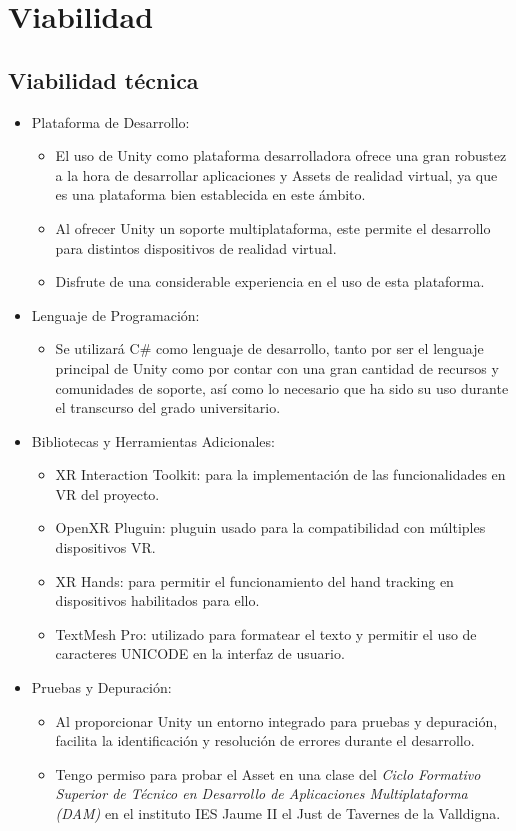 \section{Viabilidad}

\subsection{Viabilidad técnica}

\begin{itemize}
	\item Plataforma de Desarrollo:
	\begin{itemize}
		\item El uso de Unity como plataforma desarrolladora ofrece una gran robustez a la hora de desarrollar aplicaciones y Assets de realidad virtual, ya que es una plataforma bien establecida en este ámbito.
		\item Al ofrecer Unity un soporte multiplataforma, este permite el desarrollo para distintos dispositivos de realidad virtual.
		\item Disfrute de una considerable experiencia en el uso de esta plataforma.
	\end{itemize}
	\item Lenguaje de Programación:
	\begin{itemize}
		\item Se utilizará C\# como lenguaje de desarrollo, tanto por ser el lenguaje principal de Unity como por contar con una gran cantidad de recursos y comunidades de soporte, así como lo necesario que ha sido su uso durante el transcurso del grado universitario.
	\end{itemize}
	\item Bibliotecas y Herramientas Adicionales:
	\begin{itemize}
		\item XR Interaction Toolkit: para la implementación de las funcionalidades en VR del proyecto.
		\item OpenXR Pluguin: pluguin usado para la compatibilidad con múltiples dispositivos VR.
		\item XR Hands: para permitir el funcionamiento del hand tracking en dispositivos habilitados para ello.
		\item TextMesh Pro: utilizado para formatear el texto y permitir el uso de caracteres UNICODE en la interfaz de usuario.
	\end{itemize}
	\item Pruebas y Depuración:
	\begin{itemize}
		\item Al proporcionar Unity un entorno integrado para pruebas y depuración, facilita la identificación y resolución de errores durante el desarrollo.
		\item Tengo permiso para probar el Asset en una clase del \textit{Ciclo Formativo Superior de Técnico en Desarrollo de Aplicaciones Multiplataforma (DAM)} en el instituto IES Jaume II el Just de Tavernes de la Valldigna.
	\end{itemize}	
\end{itemize}


